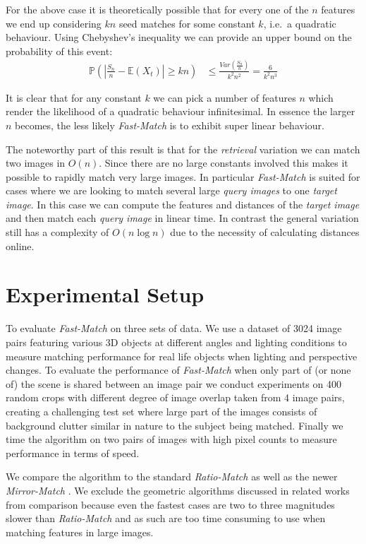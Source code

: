 \documentclass[10pt,twocolumn,letterpaper]{article}
\begin{document}
For the above case it is theoretically possible that for every one of the $n$ features we end up considering $kn$ seed matches for some constant $k$, i.e.\ a quadratic behaviour. Using Chebyshev's inequality we can provide an upper bound on the probability of this event:
\begin{align}
    \label{bound}
    \mathbb{P}\left(\left| \frac{S_n}{n} - \mathbb{E}(X_t) \right| \ge kn\right) &\le \frac{Var\left(\frac{S_n}{n}\right)}{k^2n^2} = \frac{6}{k^2n^3}
\end{align}

It is clear that for any constant $k$ we can pick a number of features $n$ which render the likelihood of a quadratic behaviour infinitesimal. In essence the larger $n$ becomes, the less likely \emph{Fast-Match} is to exhibit super linear behaviour.

The noteworthy part of this result is that for the \emph{retrieval} variation we can match two images in $O(n)$. Since there are no large constants involved this makes it possible to rapidly match very large images. In particular \emph{Fast-Match} is suited for cases where we are looking to match several large \emph{query images} to one \emph{target image}. In this case we can compute the features and distances of the \emph{target image} and then match each \emph{query image} in linear time. In contrast the general variation still has a complexity of $O(n \log n)$ due to the necessity of calculating distances online.

\section{Experimental Setup}
\label{experiments}
%
To evaluate \emph{Fast-Match} on three sets of data. We use a dataset of 3024 image pairs featuring various 3D objects at different angles and lighting conditions to measure matching performance for real life objects when lighting and perspective changes. To evaluate the performance of \emph{Fast-Match} when only part of (or none of) the scene is shared between an image pair we conduct experiments on 400 random crops with different degree of image overlap taken from 4 image pairs, creating a challenging test set where large part of the images consists of background clutter similar in nature to the subject being matched. Finally we time the algorithm on two pairs of images with high pixel counts to measure performance in terms of speed. 

We compare the algorithm to the standard \emph{Ratio-Match} \cite{lowe2004sift} as well as the newer \emph{Mirror-Match} \cite{arnfred2013mirror}. We exclude the geometric algorithms discussed in related works from comparison because even the fastest cases are two to three magnitudes slower than \emph{Ratio-Match} and as such are too time consuming to use when matching features in large images. 
\end{document}
